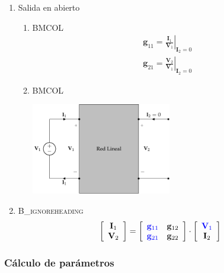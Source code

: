 \begin{enumerate}
\item Salida en abierto
\label{sec:org490be28}

\begin{enumerate}
\item \hfill{}\textsc{BMCOL}
\label{sec:orgb210ca2}
\renewcommand{\arraystretch}{2}
\[
  \begin{array}{c}
    \mathbf{g}_{11} = \left.\frac{\mathbf{I}_1}{\mathbf{V}_1}\right\rvert_{\mathbf{I}_2 = 0} \\
    \mathbf{g}_{21} = \left.\frac{\mathbf{V}_2}{\mathbf{V}_1}\right\rvert_{\mathbf{I}_2 = 0}
  \end{array}
\]

\item \hfill{}\textsc{BMCOL}
\label{sec:orga9cc93f}
\begin{center}
\includegraphics[height=4cm]{../figs/parametrosG_entrada.pdf}
\end{center}
\end{enumerate}

\item \hfill{}\textsc{B\_ignoreheading}
\label{sec:org1c0c522}
\[
  \left[
    \begin{array}{c}
      \mathbf{I}_1\\
      \mathbf{V}_2
    \end{array}
  \right] =
  \left[
    \begin{array}{cc}
      \color{blue}{\mathbf{g}_{11}} & \mathbf{g}_{12}\\
      \color{blue}{\mathbf{g}_{21}} & \mathbf{g}_{22}
    \end{array}
  \right] \cdot
  \left[
    \begin{array}{c}
      \color{blue}{\mathbf{V}_1}\\
      \mathbf{I}_2
    \end{array}
  \right]
\]
\end{enumerate}

\subsubsection{Cálculo de parámetros}
\label{sec:org4b6c520}

